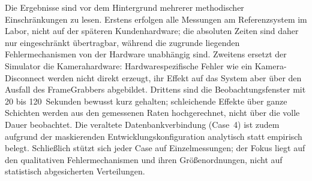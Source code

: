 Die Ergebnisse sind vor dem Hintergrund mehrerer methodischer Einschränkungen zu lesen.
Erstens erfolgen alle Messungen am Referenzsystem im Labor, nicht auf der späteren
Kundenhardware; die absoluten Zeiten sind daher nur eingeschränkt übertragbar, während die
zugrunde liegenden Fehlermechanismen von der Hardware unabhängig sind. Zweitens ersetzt der
Simulator die Kamerahardware: Hardwarespezifische Fehler wie ein Kamera-Disconnect werden
nicht direkt erzeugt, ihr Effekt auf das System aber über den Ausfall des FrameGrabbers
abgebildet. Drittens sind die Beobachtungsfenster mit 20 bis 120~Sekunden bewusst kurz
gehalten; schleichende Effekte über ganze Schichten werden aus den gemessenen Raten
hochgerechnet, nicht über die volle Dauer beobachtet. Die veraltete Datenbankverbindung
(Case~4) ist zudem aufgrund der maskierenden Entwicklungskonfiguration analytisch statt
empirisch belegt. Schließlich stützt sich jeder Case auf Einzelmessungen; der Fokus liegt
auf den qualitativen Fehlermechanismen und ihren Größenordnungen, nicht auf statistisch
abgesicherten Verteilungen.
